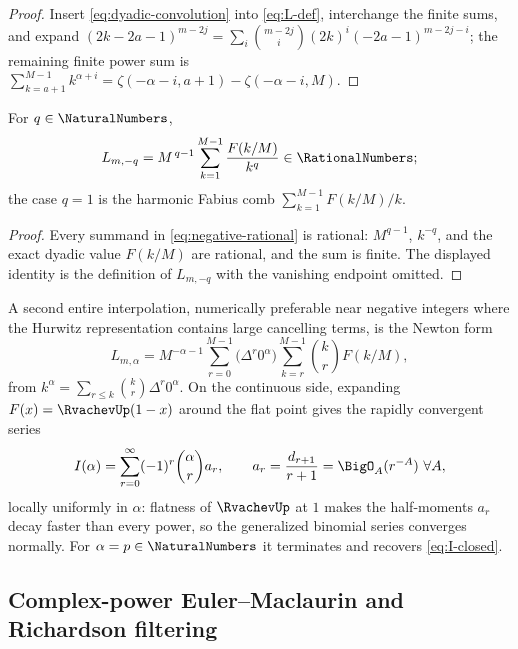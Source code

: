 \begin{proof}
Insert \eqref{eq:dyadic-convolution} into \eqref{eq:L-def},
interchange the finite sums, and expand
$(2k-2a-1)^{m-2j}
=\sum_i\binom{m-2j}i(2k)^{i}(-2a-1)^{m-2j-i}$; the remaining finite
power sum is
$\sum_{k=a+1}^{M-1}k^{\alpha+i}
=\zeta(-\alpha-i,a+1)-\zeta(-\alpha-i,M)$.
\end{proof}

\begin{corollary}
\label{cor:negative-rational}
For $q\in\NaturalNumbers$,
\begin{equation}
 L_{m,-q}
 =M^{\,q-1}\sum_{k=1}^{M-1}\frac{F(k/M)}{k^{q}}\in\RationalNumbers;
 \label{eq:negative-rational}
\end{equation}
the case $q=1$ is the harmonic Fabius comb
$\sum_{k=1}^{M-1}F(k/M)/k$.
\end{corollary}

\begin{proof}
Every summand in \eqref{eq:negative-rational} is rational: $M^{q-1}$,
$k^{-q}$, and the exact dyadic value $F(k/M)$ are rational, and the sum is
finite.  The displayed identity is the definition of $L_{m,-q}$ with
the vanishing endpoint omitted.
\end{proof}

A second entire interpolation, numerically preferable near negative
integers where the Hurwitz representation contains large cancelling
terms, is the Newton form
\begin{equation}
 L_{m,\alpha}=M^{-\alpha-1}
 \sum_{r=0}^{M-1}\bigl(\Delta^{r}0^{\alpha}\bigr)
 \sum_{k=r}^{M-1}\binom kr F(k/M),
 \label{eq:Newton-comb}
\end{equation}
from $k^{\alpha}=\sum_{r\le k}\binom kr\Delta^{r}0^{\alpha}$.  On the
continuous side, expanding $F(x)=\RvachevUp(1-x)$ around the flat point gives
the rapidly convergent series
\begin{equation}
 I(\alpha)=\sum_{r=0}^{\infty}(-1)^{r}\binom{\alpha}{r}a_r,
 \qquad
 a_r=\frac{d_{r+1}}{r+1}
 =\BigO_A(r^{-A})\ \forall A,
 \label{eq:I-alpha-series}
\end{equation}
locally uniformly in $\alpha$: flatness of $\RvachevUp$ at $1$ makes the
half-moments $a_r$ decay faster than every power, so the generalized
binomial series converges normally.  For $\alpha=p\in\NaturalNumbers$ it
terminates and recovers \eqref{eq:I-closed}.

\subsection{Complex-power Euler--Maclaurin and Richardson filtering}

